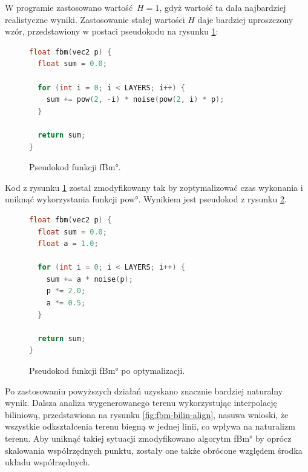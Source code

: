 W programie zastosowano wartość $H = 1$, gdyż wartość ta dała najbardziej realistyczne wyniki.
Zastosowanie stałej wartości $H$ daje bardziej uproszczony wzór, przedstawiony w postaci pseudokodu na rysunku \ref{fig:pseudokod:fbm}:

\begin{figure}[H]
\centering
\begin{lstlisting}[language=C]
float fbm(vec2 p) {
  float sum = 0.0;

  for (int i = 0; i < LAYERS; i++) {
    sum += pow(2, -i) * noise(pow(2, i) * p);
  }

  return sum;
}
\end{lstlisting}
\caption{Pseudokod funkcji \ang{fBm}.}
\label{fig:pseudokod:fbm}
\end{figure}

Kod z rysunku \ref{fig:pseudokod:fbm} został zmodyfikowany tak by zoptymalizować czas wykonania i uniknąć wykorzystania funkcji \ang{pow}\cite{bib:glslpow}. Wynikiem jest pseudokod z rysunku \ref{fig:pseudokod:fbm-opt}.

\begin{figure}[H]
\centering
\begin{lstlisting}[language=C]
float fbm(vec2 p) {
  float sum = 0.0;
  float a = 1.0;

  for (int i = 0; i < LAYERS; i++) {
    sum += a * noise(p);
    p *= 2.0;
    a *= 0.5;
  }

  return sum;
}
\end{lstlisting}
\caption{Pseudokod funkcji \ang{fBm} po optymalizacji.}
\label{fig:pseudokod:fbm-opt}
\end{figure}

Po zastosowaniu powyższych działań uzyskano znacznie bardziej naturalny wynik. Dalsza analiza wygenerowanego terenu wykorzystując interpolację biliniową, przedstawiona na rysunku \ref{fig:fbm-bilin-align}, nasuwa wnioski, że wszystkie odkształcenia terenu biegną w jednej linii, co wpływa na naturalizm terenu. Aby uniknąć takiej sytuacji zmodyfikowano algorytm \ang{fBm} by oprócz skalowania współrzędnych punktu, zostały one także obrócone względem środka układu współrzędnych.

